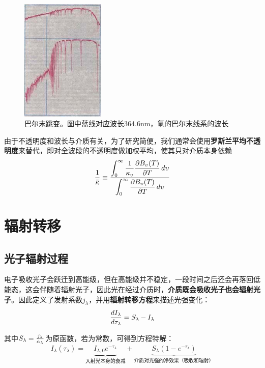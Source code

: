 \begin{figure}[hbt]
  \centering
  \includegraphics[width=4cm]{chapters/09/balmerjump}
  \caption{巴尔末跳变。图中蓝线对应波长364.6\;nm，氢的巴尔末线系的波长}
  \label{fig:balmerjump}
\end{figure}

由于不透明度和波长与介质有关，为了研究简便，我们通常会使用\textbf{罗斯兰平均不透明度}来替代，即对全波段的不透明度做加权平均，使其只对介质本身依赖
\begin{equation}
  {1\over \bar\kappa} \equiv{\displaystyle\int_0^\infty {1\over \kappa_\upsilon}{\partial B_\upsilon(T)\over \partial T}\,d\upsilon \over \displaystyle\int_0^\infty{\partial B_\upsilon(T)\over \partial T}\,d\upsilon}
\end{equation}

\section{辐射转移}
\subsection{光子辐射过程}
电子吸收光子会跃迁到高能级，但在高能级并不稳定，一段时间之后还会再落回低能态，这会伴随着辐射光子，因此光在经过介质时，\textbf{介质既会吸收光子也会辐射光子}。因此定义了发射系数$j_\lambda$，并用\textbf{辐射转移方程}来描述光强变化：
\begin{equation}
  {dI_\lambda \over d\tau_\lambda}=S_\lambda-I_\lambda
\end{equation}

其中$S_\lambda={j_\lambda\over \alpha_\lambda}$为原函数，若为常数，可得到方程特解：
\begin{equation}
  I_\lambda(\tau_\lambda)=\underbrace{I_{\lambda,0}e^{-\tau_\lambda}}_\text{入射光本身的衰减}+\underbrace{S_\lambda(1-e^{-\tau_\lambda})}_\text{介质对光强的净效果（吸收和辐射）}
\end{equation}

